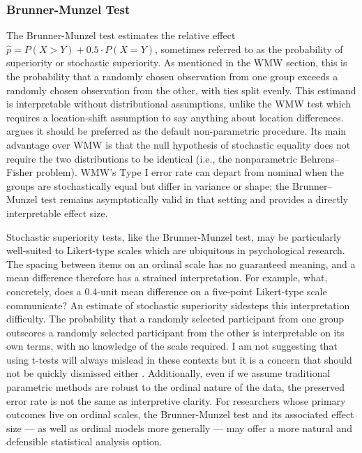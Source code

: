 \documentclass[]{interact}
\theoremstyle{plain}%
\theoremstyle{definition}
\theoremstyle{remark}
\begin{document}
\newpage

\subsubsection{Brunner-Munzel Test}\label{brunner-munzel-test}

The Brunner-Munzel test \citep{brunner2000} estimates the relative
effect \(\hat{p} = P(X > Y) + 0.5 \cdot P(X = Y)\), sometimes referred
to as the probability of superiority or stochastic superiority. As
mentioned in the WMW section, this is the probability that a randomly
chosen observation from one group exceeds a randomly chosen observation
from the other, with ties split evenly. This estimand is interpretable
without distributional assumptions, unlike the WMW test which requires a
location-shift assumption to say anything about location differences.
\citet{karch2021} argues it should be preferred as the default
non-parametric procedure. Its main advantage over WMW is that the null
hypothesis of stochastic equality does not require the two distributions
to be identical (i.e., the nonparametric Behrens--Fisher problem). WMW's
Type I error rate can depart from nominal when the groups are
stochastically equal but differ in variance or shape; the
Brunner--Munzel test remains asymptotically valid in that setting and
provides a directly interpretable effect size.

Stochastic superiority tests, like the Brunner-Munzel test, may be
particularly well-suited to Likert-type scales which are ubiquitous in
psychological research. The spacing between items on an ordinal scale
has no guaranteed meaning, and a mean difference therefore has a
strained interpretation. For example, what, concretely, does a 0.4-unit
mean difference on a five-point Likert-type scale communicate? An
estimate of stochastic superiority sidesteps this interpretation
difficulty. The probability that a randomly selected participant from
one group outscores a randomly selected participant from the other is
interpretable on its own terms, with no knowledge of the scale required.
I am not suggesting that using t-tests will always mislead in these
contexts but it is a concern that should not be quickly dismissed either
\citep{Liddell_Kruschke_2018}. Additionally, even if we assume
traditional parametric methods are robust to the ordinal nature of the
data, the preserved error rate is not the same as interpretive clarity.
For researchers whose primary outcomes live on ordinal scales, the
Brunner-Munzel test and its associated effect size --- as well as
ordinal models more generally \citep{Burkner_Vuorre_2019} --- may offer
a more natural and defensible statistical analysis option.
\end{document}
